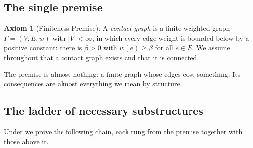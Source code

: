 \documentclass[11pt,a4paper]{article}
\theoremstyle{thmstyle}
\theoremstyle{definition}
\newtheorem{axiom}{Axiom}
\theoremstyle{remark}
\newcommand{\Gph}{\Gamma}                 %
\newcommand{\V}{V}                        %
\newcommand{\E}{E}                        %
\newcommand{\wt}{w}                       %
\newcommand{\floorc}{\beta}               %
\newcommand{\abs}[1]{\lvert#1\rvert}
\begin{document}
\subsection{The single premise}

\begin{axiom}[Finiteness Premise]
\label{ax:finite}
A \emph{contact graph} is a finite weighted graph $\Gph=(\V,\E,\wt)$ with
$\abs{\V}<\infty$, in which every edge weight is bounded below by a positive
constant: there is $\floorc>0$ with $\wt(e)\ge\floorc$ for all $e\in\E$. We
assume throughout that a contact graph exists and that it is connected.
\end{axiom}

The premise is almost nothing: a finite graph whose edges cost something. Its
consequences are almost everything we mean by structure.

\subsection{The ladder of necessary substructures}

Under  we prove the following chain, each rung from the premise
together with those above it.
\end{document}
